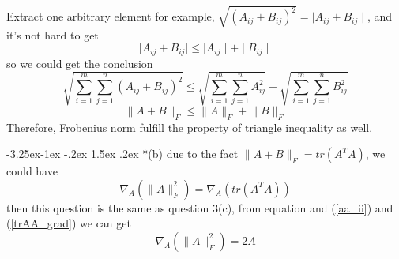 \documentclass[12pt]{article}
\makeatletter
\renewcommand\subsection{\@startsection{subsection}{2}{\z@}%
	{-3.25ex\@plus -1ex \@minus -.2ex}%
	{1.5ex \@plus .2ex}%
	{\normalfont\large\bfseries}}%
\makeatother
\begin{document}
Extract one arbitrary element for example, $\sqrt{(A_{ij}+B_{ij})^2}=\mid A_{ij}+B_{ij}\mid$, and it's not hard to get 
\begin{equation}
	\mid A_{ij}+B_{ij}\mid \le \mid A_{ij}\mid +\mid B_{ij}\mid
\end{equation}
so we could get the conclusion 
\begin{equation}
	\sqrt{\sum_{i=1}^m\sum_{j=1}^n(A_{ij}+B_{ij})^2} \le \sqrt{\sum_{i=1}^m\sum_{j=1}^n A_{ij}^2} + \sqrt{\sum_{i=1}^m\sum_{j=1}^n B_{ij}^2}
\end{equation}
\begin{equation}
	\lVert A+B\rVert_F\le \lVert A\rVert_F+\lVert B\rVert_F
\end{equation}
Therefore, Frobenius norm fulfill the property of triangle inequality as well.

\subsection*{(b)}
due to the fact $\lVert A+B\rVert_F=tr(A^TA)$, we could have
\begin{equation}\label{trAA_from}
	\nabla_A(\lVert A\rVert_F^2)=\nabla_A(tr(A^TA))
\end{equation}
then this question is the same as question 3(c), from equation and (\ref{aa_ii}) and (\ref{trAA_grad})
we can get
\begin{equation}\label{trAA_from_final}
	\nabla_A(\lVert A\rVert_F^2)=2A
\end{equation}
	



 
\end{document}
